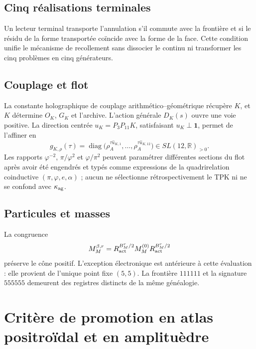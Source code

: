 \subsection{Cinq réalisations terminales}

Un lecteur terminal transporte l’annulation s’il commute avec la frontière et si le résidu de la forme transportée coïncide avec la forme de la face. Cette condition unifie le mécanisme de recollement sans dissocier le continu ni transformer les cinq problèmes en cinq générateurs.

\subsection{Couplage et flot}

La constante holographique de couplage arithmético--géométrique récupère \(K\), et \(K\) détermine \(O_K\), \(G_K\) et l’archive. L’action générale \(D_K(s)\) ouvre une voie positive. La direction centrée \(u_K=P_3P_{11}K\), satisfaisant \(u_K\perp\mathbf1\), permet de l’affiner en
\[
g_{K,\rho}(\tau)=
\operatorname{diag}
\bigl(\rho_A^{\tau\widehat u_{K,1}},\ldots,
\rho_A^{\tau\widehat u_{K,12}}\bigr)\in SL(12,\mathbb R)_{>0}.
\]
Les rapports \(\varphi^{-2}\), \(\pi/\varphi^2\) et \(\varphi/\pi^2\) peuvent paramétrer différentes sections du flot après avoir été engendrés et typés comme expressions de la quadrirelation coinductive \((\pi,\varphi,e,\alpha)\) ; aucun ne sélectionne rétrospectivement le TPK ni ne se confond avec \(\kappa_{\rm ag}\).

\subsection{Particules et masses}

La congruence
\[
M_M^{\beta,r}
=R_{\rm act}^{B_M^r/2}M_M^{(0)}R_{\rm act}^{B_M^r/2}
\]
préserve le cône positif. L’exception électronique est antérieure à cette évaluation : elle provient de l’unique point fixe \((5,5)\). La frontière \(111111\) et la signature \(555555\) demeurent des registres distincts de la même généalogie.

\section{Critère de promotion en atlas positroïdal et en amplituèdre}


